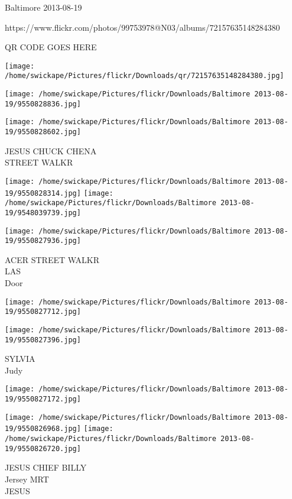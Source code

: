 \documentclass[10pt,letterpaper]{article}
\begin{document}
Baltimore 2013-08-19

https://www.flickr.com/photos/99753978@N03/albums/72157635148284380

QR CODE GOES HERE

\texttt{[image: /home/swickape/Pictures/flickr/Downloads/qr/72157635148284380.jpg]}
\pagebreak

\texttt{[image: /home/swickape/Pictures/flickr/Downloads/Baltimore 2013-08-19/9550828836.jpg]}

\vspace{0.25in}
\texttt{[image: /home/swickape/Pictures/flickr/Downloads/Baltimore 2013-08-19/9550828602.jpg]}

JESUS CHUCK CHENA\\
STREET WALKR\\
\pagebreak

\texttt{[image: /home/swickape/Pictures/flickr/Downloads/Baltimore 2013-08-19/9550828314.jpg]}
\texttt{[image: /home/swickape/Pictures/flickr/Downloads/Baltimore 2013-08-19/9548039739.jpg]}

\texttt{[image: /home/swickape/Pictures/flickr/Downloads/Baltimore 2013-08-19/9550827936.jpg]}

ACER STREET WALKR\\
LAS\\
Door\\
\pagebreak

\texttt{[image: /home/swickape/Pictures/flickr/Downloads/Baltimore 2013-08-19/9550827712.jpg]}

\vspace{0.25in}
\texttt{[image: /home/swickape/Pictures/flickr/Downloads/Baltimore 2013-08-19/9550827396.jpg]}

SYLVIA\\
Judy\\
\pagebreak

\texttt{[image: /home/swickape/Pictures/flickr/Downloads/Baltimore 2013-08-19/9550827172.jpg]}

\vspace{0.25in}
\texttt{[image: /home/swickape/Pictures/flickr/Downloads/Baltimore 2013-08-19/9550826968.jpg]}
\texttt{[image: /home/swickape/Pictures/flickr/Downloads/Baltimore 2013-08-19/9550826720.jpg]}

JESUS CHIEF BILLY\\
Jersey MRT\\
JESUS\\
\pagebreak
\end{document}
